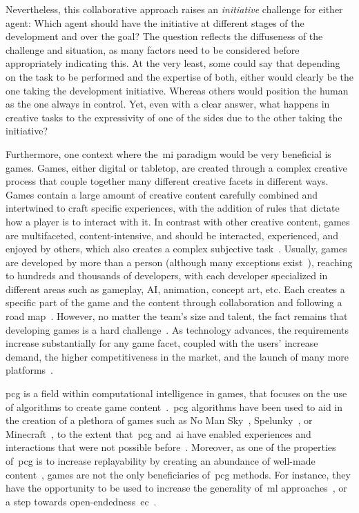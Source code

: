 Nevertheless, this collaborative approach raises an \emph{initiative} challenge for either agent: Which agent should have the initiative at different stages of the development and over the goal? The question reflects the diffuseness of the challenge and situation, as many factors need to be considered before appropriately indicating this. At the very least, some could say that depending on the task to be performed and the expertise of both, either would clearly be the one taking the development initiative. Whereas others would position the human as the one always in control. Yet, even with a clear answer, what happens in creative tasks to the expressivity of one of the sides due to the other taking the initiative? 

Furthermore, one context where the~\acrshort{mi} paradigm would be very beneficial is games. Games, either digital or tabletop, are created through a complex creative process that couple together many different creative facets in different ways. Games contain a large amount of creative content carefully combined and intertwined to craft specific experiences, with the addition of rules that dictate how a player is to interact with it. In contrast with other creative content, games are multifaceted, content-intensive, and should be interacted, experienced, and enjoyed by others, which also creates a complex subjective task~\cite{liapis_computational_2014}. Usually, games are developed by more than a person (although many exceptions exist~\cite{minecraft,undertale,stardewvalley}), reaching to hundreds and thousands of developers, with each developer specialized in different areas such as gameplay, AI, animation, concept art, etc. Each creates a specific part of the game and the content through collaboration and following a road map~\cite[Chapter~14]{fullerton_game_2004}. However, no matter the team's size and talent, the fact remains that developing games is a hard challenge~\cite{blow_game_2004}. As technology advances, the requirements increase substantially for any game facet, coupled with the users' increase demand, the higher competitiveness in the market, and the launch of many more platforms~\cite{washburn_jr_what_2016}.

\acrfull{pcg} is a field within computational intelligence in games, that focuses on the use of algorithms to create game content~\cite{yannakakis_artificial_2018}.~\acrshort{pcg} algorithms have been used to aid in the creation of a plethora of games such as No Man Sky~\cite{nomansky}, Spelunky~\cite{spelunky}, or Minecraft~\cite{minecraft}, to the extent that~\acrshort{pcg} and~\acrshort{ai} have enabled experiences and interactions that were not possible before~\cite{aidungeon,rogue,elite}. Moreover, as one of the properties of~\acrshort{pcg} is to increase replayability by creating an abundance of well-made content~\cite{shaker_procedural_2016}, games are not the only beneficiaries of~\acrshort{pcg} methods. For instance, they have the opportunity to be used to increase the generality of~\acrfull{ml} approaches~\cite{risi_increasing_2020}, or a step towards open-endedness~\acrfull{ec}~\cite{clune_ai-gas_2019}. 

